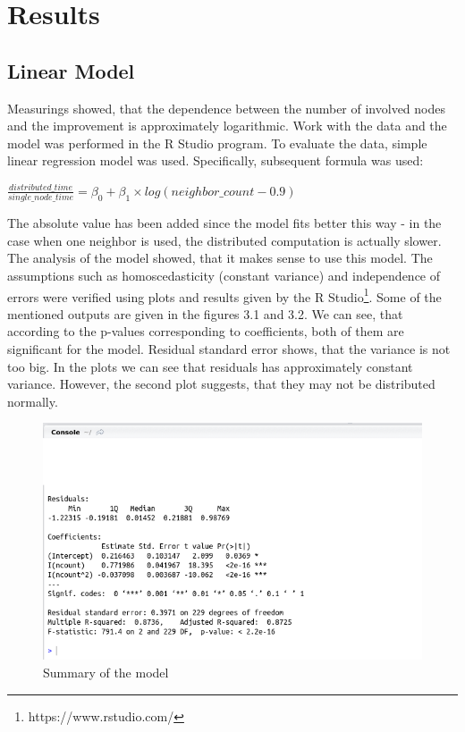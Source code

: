 \section{Results}\label{results}

\subsection{Linear Model}\label{linear-model}

Measurings showed, that the dependence between the number of involved
nodes and the improvement is approximately logarithmic. Work with the
data and the model was performed in the R Studio program. To evaluate
the data, simple linear regression model was used. Specifically,
subsequent formula was used:

\begin{center}
$\frac{distributed\_time}{single\_node\_time} = \beta_0 + \beta_1 \times log(neighbor\_count - 0.9)$
\end{center}

The absolute value has been added since the model fits better this way -
in the case when one neighbor is used, the distributed computation is
actually slower. The analysis of the model showed, that it makes sense
to use this model. The assumptions such as homoscedasticity (constant
variance) and independence of errors were verified using plots and
results given by the R Studio\footnote{https://www.rstudio.com/}. Some
of the mentioned outputs are given in the figures 3.1 and 3.2. We can
see, that according to the p-values corresponding to coefficients, both
of them are significant for the model. Residual standard error shows,
that the variance is not too big. In the plots we can see that residuals
has approximately constant variance. However, the second plot suggests,
that they may not be distributed normally.

\begin{figure}[h]
\begin{center}
\includegraphics[scale=0.65]{./img/model.png}
\caption{Summary of the model}
\end{center}
\end{figure}

